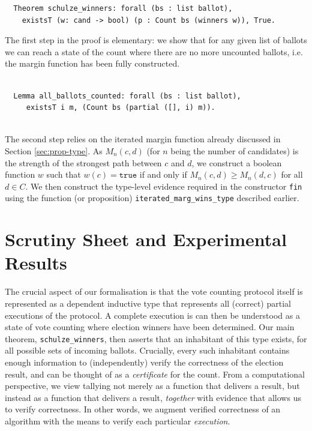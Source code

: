 \begin{verbatim}
  Theorem schulze_winners: forall (bs : list ballot),
    existsT (w: cand -> bool) (p : Count bs (winners w)), True.
\end{verbatim}


\noindent
The first step in the proof is elementary: we show that for any
given list of ballots we can reach a state of the count where there are
no more uncounted ballots, i.e. the margin function has been
fully constructed.


\begin{verbatim}

  Lemma all_ballots_counted: forall (bs : list ballot), 
     existsT i m, (Count bs (partial ([], i) m)).
        
\end{verbatim}
    
   
   
The second step relies on the iterated margin function already
discussed in Section \ref{sec:prop-type}. As $M_n(c, d)$ (for $n$ being
the number of candidates) is the strength of the strongest path
between $c$ and $d$, we construct a boolean function
$w$ such that $w(c) = \mathtt{true}$ if and only if $M_n(c, d) \geq
M_n(d, c)$ for all $d \in C$. We then construct the type-level
evidence required in the constructor \texttt{fin} 
using  the function (or proposition)
\texttt{iterated\_marg\_wins\_type} described earlier. 


\section{Scrutiny Sheet and Experimental Results}
\label{sec:scrunity_sheet}
	The crucial aspect of our formalisation is that the vote counting
protocol itself is represented as a dependent inductive type
that represents all (correct) partial executions of
the protocol.  A complete execution is can then be understood as a
state of vote counting where election winners have been determined.
Our main theorem, \texttt{schulze\_winners}, then asserts that an 
inhabitant of this type
exists, for all possible sets of incoming ballots. 
Crucially, every such inhabitant contains enough information
to (independently) verify the correctness of the election result,
and can be thought of as a \emph{certificate} for the count.
From a computational perspective, we view tallying not merely as a
function that delivers a result, but instead as a function that
delivers a result, \emph{together} with evidence that allows us to
verify correctness. In other words, we augment verified correctness
of an algorithm with the means to verify each particular
\emph{execution}.


